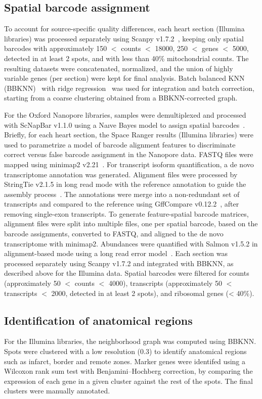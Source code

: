 \documentclass[utf8]{FrontiersinHarvard} %
\begin{document}
\subsection*{Spatial barcode assignment}
To account for source-specific quality differences, each heart section (Illumina libraries) was processed separately using Scanpy v1.7.2~\citep{Wolf2018:scanpy}, keeping only spatial barcodes with approximately 150 $<$ counts $<$ 18000, 250 $<$ genes $<$ 5000, detected in at least 2 spots, and with less than 40\% mitochondrial counts. The resulting datasets were concatenated, normalized, and the union of highly variable genes (per section) were kept for final analysis. Batch balanced KNN (BBKNN)~\citep{Polanski2019:bbknn} with ridge regression~\citep{Park2020:thymic_atlas} was used for integration and batch correction, starting from a coarse clustering obtained from a BBKNN-corrected graph. 

For the Oxford Nanopore libraries, samples were demultiplexed and processed with ScNapBar v1.1.0 using a Naıve Bayes model to assign spatial barcodes~\citep{Wang2021:scnapbar}.
Briefly, for each heart section, the Space Ranger results (Illumina libraries) were used to parametrize a model of barcode alignment features to discriminate correct versus false barcode assignment in the Nanopore data. 
FASTQ files were mapped using minimap2 v2.21~\citep{Heng2018:minimap}. 
For transcript isoform quantification, a de novo transcriptome annotation was generated. 
Alignment files were processed by StringTie v2.1.5 in long read mode with the reference annotation to guide the assembly process~\citep{Kovaka2019:stringtie_long}. 
The annotations were merge into a non-redundant set of transcripts and compared to the reference using GffCompare v0.12.2~\citep{Pertea2020:gff}, after removing single-exon transcripts. 
To generate feature-spatial barcode matrices, alignment files were split into multiple files, one per spatial barcode, based on the barcode assignments, converted to FASTQ, and aligned to the de novo transcriptome with minimap2. 
Abundances were quantified with Salmon v1.5.2 in alignment-based mode using a long read error model~\citep{Patro2017:salmon}. 
Each section was processed separately using Scanpy v1.7.2 and integrated with BBKNN, as described above for the Illumina data.
Spatial barcodes were filtered for counts (approximately 50 $<$ counts $<$ 4000), transcripts (approximately 50 $<$ transcripts $<$ 2000, detected in at least 2 spots), and ribosomal genes (< 40\%).

\subsection*{Identification of anatomical regions}
For the Illumina libraries, the neighborhood graph was computed using BBKNN. Spots were clustered with a low resolution (0.3) to identify anatomical regions such as infarct, border and remote zones. Marker genes were identifed using a Wilcoxon rank sum test with Benjamini–Hochberg correction, by comparing the expression of each gene in a given cluster against the rest of the spots. The final clusters were manually annotated.
\end{document}
